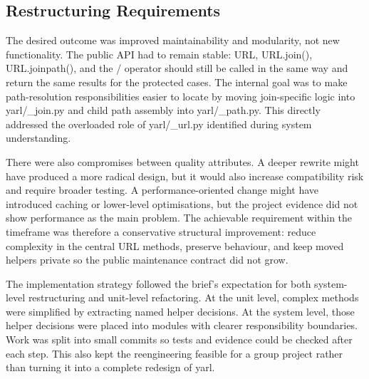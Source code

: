 \documentclass[11pt,a4paper]{article}
\begin{document}
\subsection*{Restructuring Requirements}


The desired outcome was improved maintainability and modularity, not new functionality. The public API had to remain stable: URL, URL.join(), URL.joinpath(), and the / operator should still be called in the same way and return the same results for the protected cases. The internal goal was to make path-resolution responsibilities easier to locate by moving join-specific logic into yarl/\_join.py and child path assembly into yarl/\_path.py. This directly addressed the overloaded role of yarl/\_url.py identified during system understanding.


There were also compromises between quality attributes. A deeper rewrite might have produced a more radical design, but it would also increase compatibility risk and require broader testing. A performance-oriented change might have introduced caching or lower-level optimisations, but the project evidence did not show performance as the main problem. The achievable requirement within the timeframe was therefore a conservative structural improvement: reduce complexity in the central URL methods, preserve behaviour, and keep moved helpers private so the public maintenance contract did not grow.


The implementation strategy followed the brief's expectation for both system-level restructuring and unit-level refactoring. At the unit level, complex methods were simplified by extracting named helper decisions. At the system level, those helper decisions were placed into modules with clearer responsibility boundaries. Work was split into small commits so tests and evidence could be checked after each step. This also kept the reengineering feasible for a group project rather than turning it into a complete redesign of yarl.
\end{document}
